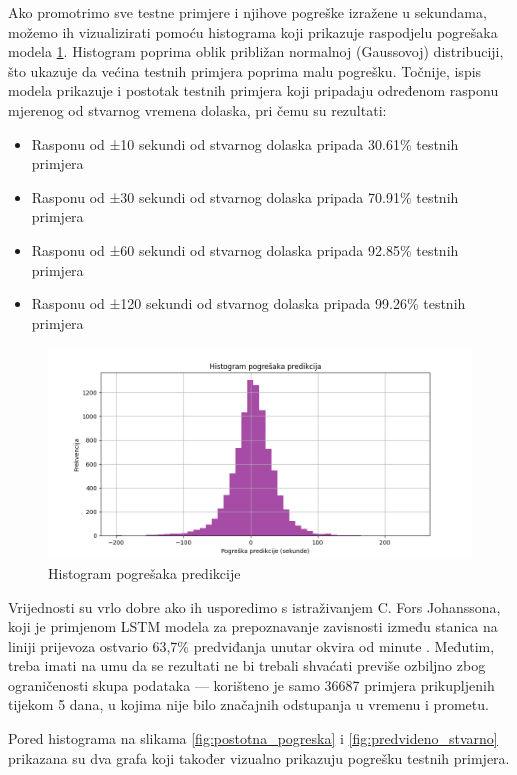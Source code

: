 \documentclass[seminarskirad]{fer}
\begin{document}
Ako promotrimo sve testne primjere i njihove pogreške izražene u sekundama, možemo ih vizualizirati pomoću histograma koji prikazuje raspodjelu pogrešaka modela \ref{fig:histogram}. Histogram poprima oblik približan normalnoj (Gaussovoj) distribuciji, što ukazuje da većina testnih primjera poprima malu pogrešku. Točnije, ispis modela prikazuje i postotak testnih primjera koji pripadaju određenom rasponu mjerenog od stvarnog vremena dolaska, pri čemu su rezultati:
\begin{itemize}
	\item Rasponu od ±10 sekundi od stvarnog dolaska pripada 30.61\% testnih primjera
	\item Rasponu od ±30 sekundi od stvarnog dolaska pripada 70.91\% testnih primjera
	\item Rasponu od ±60 sekundi od stvarnog dolaska pripada 92.85\% testnih primjera
	\item Rasponu od ±120 sekundi od stvarnog dolaska pripada 99.26\% testnih primjera
\end{itemize}

\begin{figure}[htb]
		\centering
		\includegraphics[width=0.8\linewidth]{Figures/histogram.png}
		\caption{Histogram pogrešaka predikcije}
		\label{fig:histogram}
\end{figure}

Vrijednosti su vrlo dobre ako ih usporedimo s istraživanjem C. Fors Johanssona, koji je primjenom LSTM modela za prepoznavanje zavisnosti između stanica na liniji prijevoza ostvario 63,7\% predviđanja unutar okvira od  minute \cite{article3}.
Međutim, treba imati na umu da se rezultati ne bi trebali shvaćati previše ozbiljno zbog ograničenosti skupa podataka — korišteno je samo 36687 primjera prikupljenih tijekom 5 dana, u kojima nije bilo značajnih odstupanja u vremenu i prometu.

Pored histograma na slikama \ref{fig:postotna_pogreska} i \ref{fig:predvideno_stvarno} prikazana su dva grafa koji također vizualno prikazuju pogrešku testnih primjera.
\end{document}
